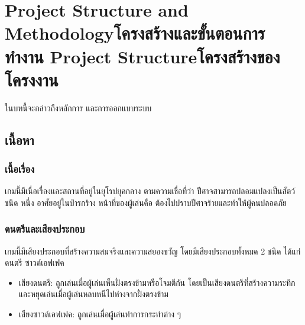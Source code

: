 \chapter{\ifproject%
\ifenglish Project Structure and Methodology\else โครงสร้างและขั้นตอนการทำงาน\fi
\else%
\ifenglish Project Structure\else โครงสร้างของโครงงาน\fi
\fi
}

ในบทนี้จะกล่าวถึงหลักการ และการออกแบบระบบ

\makeatletter


\makeatother

\section{เนื้อหา}

\subsection{เนื้อเรื่อง}

เกมนี้มีเนื่อเรื่องและสถานที่อยู่ในยุโรปยุคกลาง ตามความเชื่อที่ว่า ปีศาจสามารถปลอมแปลงเป็นสัตว์ชนิด
หนึ่ง อาศัยอยู่ในป่ารกร้าง หน้าที่ของผู้เล่นคือ ต้องไปปราบปีศาจร้ายและทําให้ผู้คนปลอดภัย

\subsection{ดนตรีและเสียงประกอบ}

เกมนี้มีเสียงประกอบที่สร้างความสมจริงและความสยองขวัญ โดยมีเสียงประกอบทั้งหมด 2 ชนิด ได้แก่ ดนตรี ซาวด์เอฟเฟค
\begin{itemize}
  \item เสียงดนตรี: ถูกเล่นเมื่อผู้เล่นเห็นฝั่งตรงข้ามหรือโจมตีกัน โดยเป็นเสียงดนตรีที่สร้างความระทึก และหยุดเล่นเมื่อผู้เล่นหลบหนีไปห่างจากฝั่งตรงข้าม
  \item เสียงซาวด์เอฟเฟค: ถูกเล่นเมื่อผู้เล่นทำการกระทำต่าง ๆ
\end{itemize}

